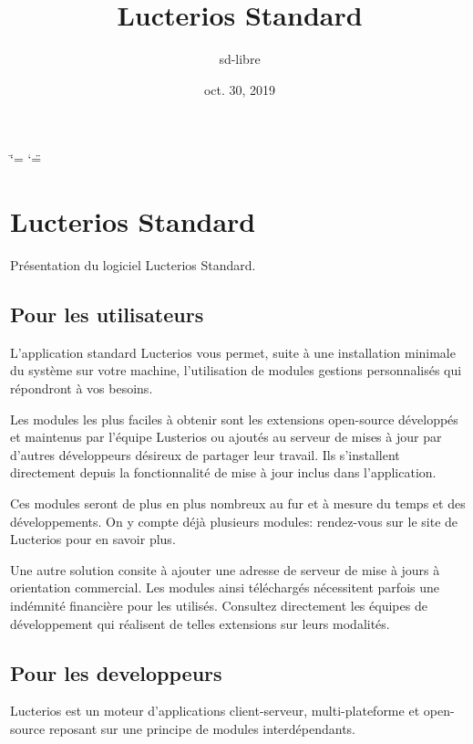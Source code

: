 \documentclass[letterpaper,10pt,french]{sphinxmanual}
\title{Lucterios Standard}
\date{oct. 30, 2019}
\author{sd-libre}
\begin{document}
\ifdefined\shorthandoff
  \ifnum\catcode`\=\string=\active\shorthandoff{=}\fi
  \ifnum\catcode`\"=\active{}\fi
\fi

\pagestyle{empty}
\sphinxmaketitle
\pagestyle{plain}
\sphinxtableofcontents
\pagestyle{normal}
\label{\detokenize{index::doc}}



\chapter{Lucterios Standard}
\label{\detokenize{standard/index:lucterios-standard}}\label{\detokenize{standard/index::doc}}
Présentation du logiciel Lucterios Standard.


\section{Pour les utilisateurs}
\label{\detokenize{standard/index:pour-les-utilisateurs}}
L’application standard Lucterios vous permet, suite à une installation minimale du système sur votre machine, l’utilisation de modules gestions personnalisés qui répondront à vos besoins.

Les modules les plus faciles à obtenir sont les extensions open-source développés et maintenus par l’équipe Lusterios ou ajoutés au serveur de mises à jour par d’autres développeurs désireux de partager leur travail. Ils s’installent directement depuis la fonctionnalité de mise à jour inclus dans l’application.

Ces modules seront de plus en plus nombreux au fur et à mesure du temps et des développements. On y compte déjà plusieurs modules: rendez-vous sur le site de Lucterios pour en savoir plus.

Une autre solution consite à ajouter une adresse de serveur de mise à jours à orientation commercial. Les modules ainsi téléchargés nécessitent parfois une indémnité financière pour les utilisés. Consultez directement les équipes de développement qui réalisent de telles extensions sur leurs modalités.


\section{Pour les developpeurs}
\label{\detokenize{standard/index:pour-les-developpeurs}}
Lucterios est un moteur d’applications client-serveur, multi-plateforme et open-source reposant sur une principe de modules interdépendants.
\end{document}
